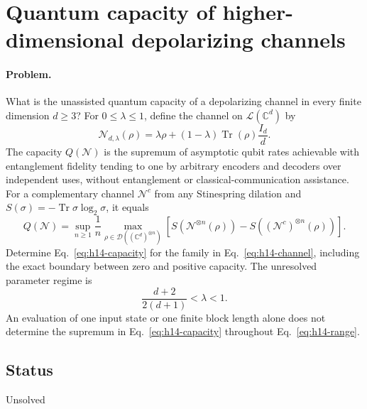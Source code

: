 \section{Quantum capacity of higher-dimensional depolarizing channels}
\label{sec:op_6690dfacb75e8dc0}

\paragraph{Problem.}
What is the unassisted quantum capacity of a depolarizing channel in every finite dimension $d\geq3$? For $0\leq\lambda\leq1$, define the channel on $\mathcal L(\mathbb C^d)$ by
\begin{equation}
 \mathcal N_{d,\lambda}(\rho)=\lambda\rho+(1-\lambda)\operatorname{Tr}(\rho)\frac{I_d}{d}.
 \label{eq:h14-channel}
\end{equation}
The capacity $Q(\mathcal N)$ is the supremum of asymptotic qubit rates achievable with entanglement fidelity tending to one by arbitrary encoders and decoders over independent uses, without entanglement or classical-communication assistance. For a complementary channel $\mathcal N^c$ from any Stinespring dilation and $S(\sigma)=-\operatorname{Tr}\sigma\log_2\sigma$, it equals
\begin{equation}
 Q(\mathcal N)=\sup_{n\geq1}\frac1n\max_{\rho\in\mathcal D((\mathbb C^d)^{\otimes n})}\left[S(\mathcal N^{\otimes n}(\rho))-S((\mathcal N^c)^{\otimes n}(\rho))\right].
 \label{eq:h14-capacity}
\end{equation}
Determine Eq.~\eqref{eq:h14-capacity} for the family in Eq.~\eqref{eq:h14-channel}, including the exact boundary between zero and positive capacity. The unresolved parameter regime is
\begin{equation}
 \frac{d+2}{2(d+1)}<\lambda<1.
 \label{eq:h14-range}
\end{equation}
An evaluation of one input state or one finite block length alone does not determine the supremum in Eq.~\eqref{eq:h14-capacity} throughout Eq.~\eqref{eq:h14-range}.

\subsection*{Status}

Unsolved

